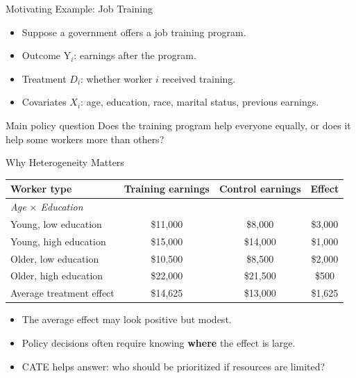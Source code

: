 \documentclass[hyperref={pdfpagelabels=false}]{beamer}
\begin{document}
\begin{frame}{Motivating Example: Job Training}
\begin{itemize}
  \item Suppose a government offers a job training program.
  \vspace{0.2cm}
  \item Outcome $\mathrm{Y}_i$: earnings after the program.
  \vspace{0.2cm}
  \item Treatment $D_i$: whether worker $i$ received training.
  \vspace{0.2cm}
  \item Covariates $X_i$: age, education, race, marital status, previous earnings.
\end{itemize}

\vspace{0.35cm}
\begin{block}{Main policy question}
  Does the training program help everyone equally, or does it help some workers more than others?
\end{block}
\end{frame}


\begin{frame}{Why Heterogeneity Matters}
\begin{center}
\small
\begin{tabular}{lccc}
\toprule
Worker type & Training earnings & Control earnings & Effect \\
\midrule
\multicolumn{4}{l}{\textit{Age $\times$ Education}} \\
\quad Young, low education  & \$11,000 & \$8,000  & \$3,000 \\
\quad Young, high education & \$15,000 & \$14,000 & \$1,000 \\
\quad Older, low education  & \$10,500 & \$8,500  & \$2,000 \\
\quad Older, high education & \$22,000 & \$21,500 & \$500   \\
\midrule
Average treatment effect     & \$14,625 & \$13,000 & \$1,625 \\
\bottomrule
\end{tabular}
\end{center}

\vspace{0.3cm}
\begin{itemize}
  \item The average effect may look positive but modest.
  \item Policy decisions often require knowing \textbf{where} the effect is large.
  \item CATE helps answer: who should be prioritized if resources are limited?
\end{itemize}
\end{frame}
\end{document}

